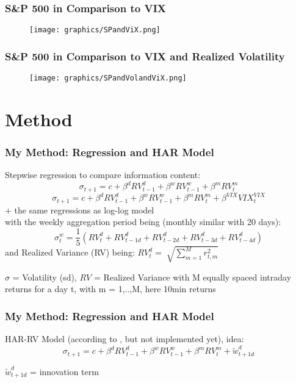 \documentclass[aspectratio=169]{beamer}
\begin{document}
\begin{frame}
\frametitle{S\&P 500 in Comparison to VIX}
	\begin{figure}
	\centering
	\texttt{[image: graphics/SPandViX.png]}
	\end{figure}
\end{frame}

\begin{frame}
\frametitle{S\&P 500 in Comparison to VIX and Realized Volatility}
	\begin{figure}
	\centering
	\texttt{[image: graphics/SPandVolandViX.png]}
	\end{figure}
\end{frame}

\section{Method}


\begin{frame}
\frametitle{My Method: Regression and HAR Model}
%
Stepwise regression to compare information content:
	\begin{equation}
	\sigma_{t+1} = c + \beta^{d} RV^{d}_{t-1} + \beta^{w} RV^{w}_{t-1} + \beta^{m} RV^{m}_{t} 
	\end{equation}	
	\begin{equation}
	\sigma_{t+1} = c + \beta^{d} RV^{d}_{t-1} + \beta^{w} RV^{w}_{t-1} + \beta^{m} RV^{m}_{t} + \beta^{VIX} VIX^{VIX}_{t}
	\end{equation}
$+$ the same regressions as log-log model\\
with the weekly aggregation period being (monthly similar with 20 days):
	\begin{equation*}
	\sigma^{w}_{t} = \frac{1}{5} (RV^{d}_{t} + RV^{d}_{t-1d} + RV^{d}_{t-2d} + RV^{d}_{t-3d} + RV^{d}_{t-4d})
	\end{equation*}
and Realized Variance (RV) being: $	RV^{d}_{t} = \sqrt[]{\sum_{m=1}^{M} r^{2}_{t,m}} $\\
%
\begin{footnotesize}
$\sigma$ = Volatility (sd), $RV$ = Realized Variance with M equally spaced intraday returns for a day t, with m = 1,..,M, here 10min returns
\end{footnotesize}
%
\end{frame}

\begin{frame}
\frametitle{My Method: Regression and HAR Model}
HAR-RV Model (according to \textcite{corsi2009}, but not implemented yet), idea:
\begin{equation}
	\sigma_{t+1} = c + \beta^{d} RV^{d}_{t-1} + \beta^{w} RV^{w}_{t-1} + \beta^{m} RV^{m}_{t} + \tilde{w}^{d}_{t+1d}
	\end{equation}	
\begin{footnotesize}
$\tilde{w}^{d}_{t+1d}$ = innovation term
\end{footnotesize}
\end{frame}
\end{document}
